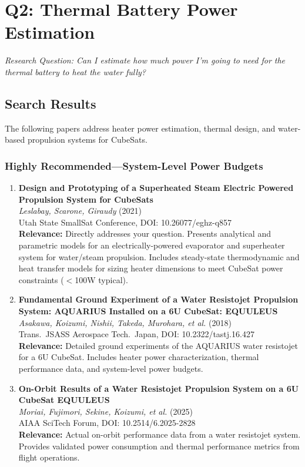 \documentclass[11pt]{article}
\begin{document}
\section{Q2: Thermal Battery Power Estimation}
\label{sec:thermal}

\textit{Research Question: Can I estimate how much power I'm going to need for the thermal battery to heat the water fully?}

\subsection{Search Results}
The following papers address heater power estimation, thermal design, and water-based propulsion systems for CubeSats.

\subsubsection{Highly Recommended---System-Level Power Budgets}

\begin{enumerate}[label=\textbf{\arabic*.}]
    \item \textbf{Design and Prototyping of a Superheated Steam Electric Powered Propulsion System for CubeSats}\\
    \textit{Leslabay, Scarone, Giraudy} (2021)\\
    Utah State SmallSat Conference, DOI: 10.26077/eghz-q857\\
    \textbf{Relevance:} Directly addresses your question. Presents analytical and parametric models for an electrically-powered evaporator and superheater system for water/steam propulsion. Includes steady-state thermodynamic and heat transfer models for sizing heater dimensions to meet CubeSat power constraints ($<$100W typical).

    \item \textbf{Fundamental Ground Experiment of a Water Resistojet Propulsion System: AQUARIUS Installed on a 6U CubeSat: EQUULEUS}\\
    \textit{Asakawa, Koizumi, Nishii, Takeda, Murohara, et al.} (2018)\\
    Trans.\ JSASS Aerospace Tech.\ Japan, DOI: 10.2322/tastj.16.427\\
    \textbf{Relevance:} Detailed ground experiments of the AQUARIUS water resistojet for a 6U CubeSat. Includes heater power characterization, thermal performance data, and system-level power budgets.

    \item \textbf{On-Orbit Results of a Water Resistojet Propulsion System on a 6U CubeSat EQUULEUS}\\
    \textit{Moriai, Fujimori, Sekine, Koizumi, et al.} (2025)\\
    AIAA SciTech Forum, DOI: 10.2514/6.2025-2828\\
    \textbf{Relevance:} Actual on-orbit performance data from a water resistojet system. Provides validated power consumption and thermal performance metrics from flight operations.
\end{enumerate}
\end{document}
